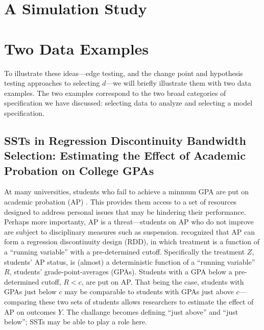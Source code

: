 \documentclass[12pt]{article}\usepackage[]{graphicx}\usepackage[]{color}
\newcommand{\hedged}{H_{0d}^{edge}}
\newcommand{\htotd}{H_{0d}^{tot}}
\begin{document}

\section{A Simulation Study}\label{sec:simulation}


\section{Two Data Examples}\label{sec:examples}

To illustrate these ideas---edge testing, and the change point and
hypothesis testing approaches to selecting $d$---we will briefly
illustrate them with two data examples.
The two examples correspond to the two broad categories of
specification we have discussed: selecting data to analyze and
selecting a model specification.

\subsection{SSTs in Regression Discontinuity Bandwidth Selection:
  Estimating the Effect of  Academic Probation on College GPAs}

At many universities, students who fail to achieve a minmum GPA are
put on academic probation (AP) \citep[See, e.g.][]{tovar2006academic}.
This provides them access to a set of resources designed to address
personal issues that may be hindering their  performance.
Perhaps more importanty, AP is a threat---students on AP who do not
improve are subject to disciplinary measures such as suspension.
\citet{LSO} recognized that AP can form a regression discontinuity
design (RDD), in which treatment is a function of a ``running
variable'' with a pre-determined cutoff.
Specifically the treatment $Z$, students' AP status, is (almost) a
deterministic function of a ``running variable'' $R$, students'
grade-point-averages (GPAs).
Students with a GPA below a pre-determined cutoff, $R<c$, are put on AP.
That being the case, students with GPAs just below $c$ may be
comparable to students with GPAs just above $c$---comparing these two
sets of students allows researchers to estimate the effect of AP on
outcomes $Y$.
The challange becomes defining ``just above'' and ``just below''; SSTs
may be able to play a role here.
\end{document}
